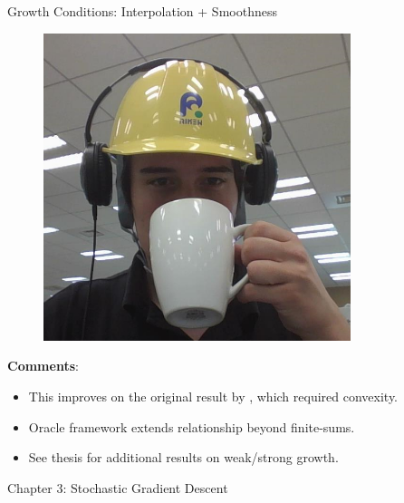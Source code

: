 \documentclass[mathserif,notheorems, hyperref={colorlinks, citecolor=blue, urlcolor=blue, linkcolor=blue}]{beamer}
\def\\{}%
\begin{document}
\begin{frame}{Growth Conditions: Interpolation + Smoothness}
\begin{center}
\begin{minipage}[t]{0.15\textwidth}
\begin{figure}[t]
                \vspace{0.5ex}

                \includegraphics[width=0.8\textwidth]{collaborators/fred}
            \end{figure} 
        \end{minipage}
        
    \end{center}
    \textbf{Comments}:
    \begin{itemize}
        \item This improves on the original result by \citet{vaswani2019fast}, which required convexity.
        \item Oracle framework extends relationship beyond finite-sums. 
        \item See thesis for additional results on weak/strong growth. 
    \end{itemize}

    \end{frame}


    \begin{frame}
       \begin{center}
          \huge Chapter 3: Stochastic Gradient Descent\\
       \end{center} 
    \end{frame}
    
\end{document}
